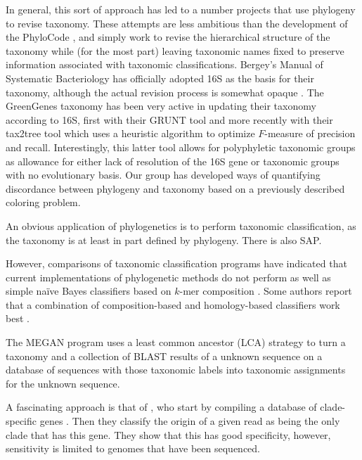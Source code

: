 \documentclass{amsart}
\begin{document}
In general, this sort of approach has led to a number projects that use phylogeny to revise taxonomy.
These attempts are less ambitious than the development of the PhyloCode \citep{forey2001phylocode}, and simply work to revise the hierarchical structure of the taxonomy while (for the most part) leaving taxonomic names fixed to preserve information associated with taxonomic classifications.
Bergey's Manual of Systematic Bacteriology has officially adopted 16S as the basis for their taxonomy, although the actual revision process is somewhat opaque \citep{kreig1984bergey}.
The GreenGenes taxonomy \citep{desantis2006greengenes} has been very active in updating their taxonomy according to 16S, first with their GRUNT tool \citep{dalevi2007automated} and more recently with their tax2tree tool \citep{mcdonald2011improved} which uses a heuristic algorithm to optimize $F$-measure of precision and recall.
Interestingly, this latter tool allows for polyphyletic taxonomic groups as allowance for either lack of resolution of the 16S gene or taxonomic groups with no evolutionary basis.
Our group \citep{matsen2012reconciling} has developed ways of quantifying discordance between phylogeny and taxonomy based on a previously described coloring problem.

An obvious application of phylogenetics is to perform taxonomic classification, as the taxonomy is at least in part defined by phylogeny.
There is also SAP.

However, comparisons of taxonomic classification programs \citep{liu2008accurate,bazinet2012comparative} have indicated that current implementations of phylogenetic methods do not perform as well as simple na\"ive Bayes classifiers based on $k$-mer composition \citep{wang2007naive,rosen2008metagenome}.
Some authors report that a combination of composition-based and homology-based classifiers work best \citep{brady2009phymm,parks2011classifying}.

The MEGAN program \citep{huson2007megan,huson2011integrative} uses a least common ancestor (LCA) strategy to turn a taxonomy and a collection of BLAST results of a unknown sequence on a database of sequences with those taxonomic labels into taxonomic assignments for the unknown sequence.


A fascinating approach is that of \citet{segata2012metagenomic}, who start by compiling a database of clade-specific genes \citep{segata2011metagenomic}.
Then they classify the origin of a given read as being the only clade that has this gene.
They show that this has good specificity, however, sensitivity is limited to genomes that have been sequenced.
\end{document}
